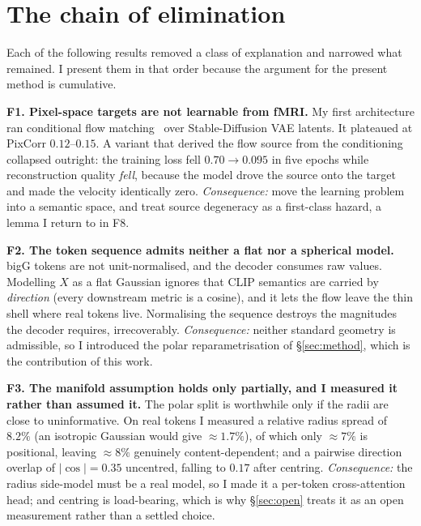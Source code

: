 \documentclass[11pt,a4paper]{article}
\theoremstyle{plain}
\theoremstyle{remark}
\newenvironment{finding}[1]%
  {\medskip\noindent\textbf{#1}\quad}%
  {\medskip}
\begin{document}
\section{The chain of elimination}

Each of the following results removed a class of explanation and narrowed what
remained. I present them in that order because the argument for the present
method is cumulative.

\begin{finding}{F1. Pixel-space targets are not learnable from fMRI.}
My first architecture ran conditional flow matching~\cite{lipman2023flow,
liu2023rectified} over Stable-Diffusion VAE latents. It plateaued at PixCorr
$0.12$--$0.15$. A variant that derived the flow source from the conditioning
collapsed outright: the training loss fell $0.70\!\to\!0.095$ in five epochs
while reconstruction quality \emph{fell}, because the model drove the source
onto the target and made the velocity identically zero.
\emph{Consequence:} move the learning problem into a semantic space, and treat
source degeneracy as a first-class hazard, a lemma I return to in F8.
\end{finding}

\begin{finding}{F2. The token sequence admits neither a flat nor a spherical model.}
bigG tokens are not unit-normalised, and the decoder consumes raw values.
Modelling $X$ as a flat Gaussian ignores that CLIP semantics are carried by
\emph{direction} (every downstream metric is a cosine), and it lets the flow
leave the thin shell where real tokens live. Normalising the sequence destroys
the magnitudes the decoder requires, irrecoverably.
\emph{Consequence:} neither standard geometry is admissible, so I introduced the
polar reparametrisation of \S\ref{sec:method}, which is the contribution of this
work.
\end{finding}

\begin{finding}{F3. The manifold assumption holds only partially, and I measured it rather than assumed it.}
The polar split is worthwhile only if the radii are close to uninformative. On
real tokens I measured a relative radius spread of $8.2\%$ (an isotropic
Gaussian would give $\approx\!1.7\%$), of which only $\approx\!7\%$ is
positional, leaving $\approx\!8\%$ genuinely content-dependent; and a
pairwise direction overlap of $|\cos| = 0.35$ uncentred, falling to $0.17$ after
centring.
\emph{Consequence:} the radius side-model must be a real model, so I made it a
per-token cross-attention head; and centring is load-bearing, which is why
\S\ref{sec:open} treats it as an open measurement rather than a settled choice.
\end{finding}
\end{document}
